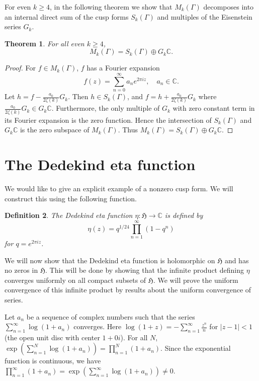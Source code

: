 \documentclass{article}
\newtheorem{theorem}{Theorem}
\newtheorem{definition}[theorem]{Definition}
\begin{document}
For even $k \geq 4$, in the following theorem we show that $M_k(\Gamma)$ decomposes into an internal direct sum of the cusp forms $S_k(\Gamma)$ and multiples of the Eisenstein series $G_k$. 

\begin{theorem}
For all even $k \geq 4$,
\[
M_k(\Gamma)=S_k(\Gamma) \oplus G_k\mathbb{C}.
\]
\end{theorem}
\begin{proof}
For $f \in M_k(\Gamma)$, $f$ has a Fourier expansion
\[
f(z)=\sum_{n=0}^\infty a_n e^{2\pi iz}, \quad a_n \in \mathbb{C}.
\] 
Let $h=f-\frac{a_0}{2\zeta(k)}G_k$. Then $h \in S_k(\Gamma)$, and $f=h+\frac{a_0}{2\zeta(k)}G_k$ where $\frac{a_0}{2\zeta(k)}G_k \in G_k\mathbb{C}$. Furthermore, the only multiple of $G_k$ with zero constant term in its Fourier expansion is the zero function. Hence the intersection of $S_k(\Gamma)$ and $G_k\mathbb{C}$ is the zero subspace of $M_k(\Gamma)$. Thus $M_k(\Gamma)=S_k(\Gamma) \oplus G_k\mathbb{C}$. 
\end{proof}

\section{The Dedekind eta function}
We would like to give an explicit example of a nonzero cusp form. We will construct this using the following function.

\begin{definition}
The {\em Dedekind eta function} $\eta:\mathfrak{H} \to \mathbb{C}$ is defined by 
\begin{equation}
\label{eqn:eta1}
\eta(z)=q^{1/24} \prod_{n=1}^\infty (1-q^n)
\end{equation}
for $q=e^{2\pi iz}$.
\end{definition}

We will now show that the Dedekind eta function is holomorphic on $\mathfrak{H}$ and has no zeros in $\mathfrak{H}$.
This will be done by showing that the infinite product defining $\eta$ converges uniformly on all
compact subsets of $\mathfrak{H}$. We will prove the uniform convergence of this infinite product
by results about the uniform convergence of series.

Let $a_n$ be a sequence of complex numbers such that the series $\sum_{n=1}^\infty \log(1+a_n)$ converges. Here $\log(1+z)=-\sum_{n=1}^\infty \frac{z^n}{n}$ for $|z-1|<1$ (the open unit disc with center $1+0i$).
For all $N$, $\exp(\sum_{n=1}^N \log(1+a_n))=\prod_{n=1}^N (1+a_n)$.
Since the exponential function is continuous, we have $\prod_{n=1}^\infty (1+a_n)=\exp(\sum_{n=1}^\infty \log(1+a_n)) \neq 0$.
\end{document}
